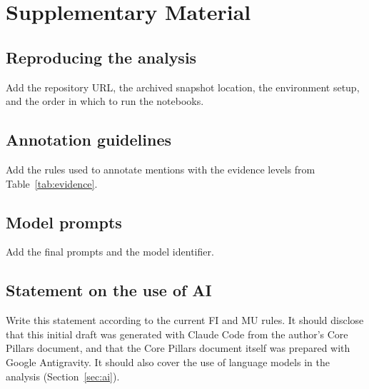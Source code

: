 \chapter{Supplementary Material}
\label{app:supplementary}

\section{Reproducing the analysis}

{Add the repository URL, the archived snapshot location, the environment setup,
and the order in which to run the notebooks.}

\section{Annotation guidelines}

{Add the rules used to annotate mentions with the evidence levels from
Table~\ref{tab:evidence}.}

\section{Model prompts}

{Add the final prompts and the model identifier.}

\section{Statement on the use of AI}

{Write this statement according to the current FI and MU rules. It should disclose
that this initial draft was generated with Claude Code from the author's Core Pillars
document, and that the Core Pillars document itself was prepared with Google Antigravity.
It should also cover the use of language models in the analysis (Section~\ref{sec:ai}).}
